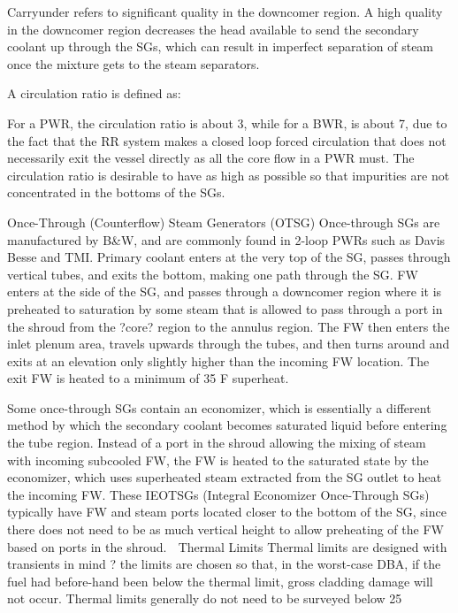 \documentclass[10pt]{article}
\begin{document}
Carryunder refers to significant quality in the downcomer region. A high quality in the downcomer region decreases the head available to send the secondary coolant up through the SGs, which can result in imperfect separation of steam once the mixture gets to the steam separators. 

A circulation ratio is defined as:


For a PWR, the circulation ratio is about 3, while for a BWR, is about 7, due to the fact that the RR system makes a closed loop forced circulation that does not necessarily exit the vessel directly as all the core flow in a PWR must. The circulation ratio is desirable to have as high as possible so that impurities are not concentrated in the bottoms of the SGs. 

Once-Through (Counterflow) Steam Generators (OTSG)
Once-through SGs are manufactured by B\&W, and are commonly found in 2-loop PWRs such as Davis Besse and TMI. Primary coolant enters at the very top of the SG, passes through vertical tubes, and exits the bottom, making one path through the SG. FW enters at the side of the SG, and passes through a downcomer region where it is preheated to saturation by some steam that is allowed to pass through a port in the shroud from the ?core? region to the annulus region. The FW then enters the inlet plenum area, travels upwards through the tubes, and then turns around and exits at an elevation only slightly higher than the incoming FW location. The exit FW is heated to a minimum of 35 F superheat. 

Some once-through SGs contain an economizer, which is essentially a different method by which the secondary coolant becomes saturated liquid before entering the tube region. Instead of a port in the shroud allowing the mixing of steam with incoming subcooled FW, the FW is heated to the saturated state by the economizer, which uses superheated steam extracted from the SG outlet to heat the incoming FW. These IEOTSGs (Integral Economizer Once-Through SGs) typically have FW and steam ports located closer to the bottom of the SG, since there does not need to be as much vertical height to allow preheating of the FW based on ports in the shroud. 
Thermal Limits
Thermal limits are designed with transients in mind ? the limits are chosen so that, in the worst-case DBA, if the fuel had before-hand been below the thermal limit, gross cladding damage will not occur. Thermal limits generally do not need to be surveyed below 25%
\end{document}
